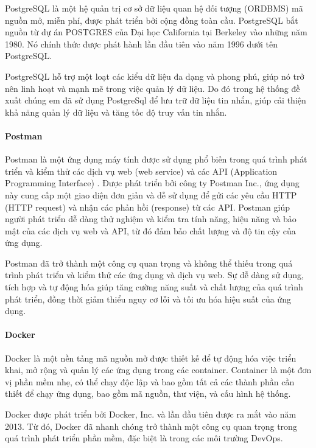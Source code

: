 PostgreSQL là một hệ quản trị cơ sở dữ liệu quan hệ đối tượng (ORDBMS) mã nguồn mở, miễn phí, được phát triển bởi cộng đồng toàn cầu. PostgreSQL bắt nguồn từ dự án POSTGRES của Đại học California tại Berkeley vào những năm 1980. Nó chính thức được phát hành lần đầu tiên vào năm 1996 dưới tên PostgreSQL.

PostgreSQL hỗ trợ một loạt các kiểu dữ liệu đa dạng và phong phú, giúp nó trở nên linh hoạt và mạnh mẽ trong việc quản lý dữ liệu. Do đó trong hệ thống đề xuất chúng em đã sử dụng PostgreSql để lưu trữ dữ liệu tin nhắn, giúp cải thiện khả năng quản lý dữ liệu và tăng tốc độ truy vấn tin nhắn.
\paragraph{Postman}
\mbox{}

Postman là một ứng dụng máy tính được sử dụng phổ biến trong quá trình phát triển và kiểm thử các dịch vụ web (web service) và các API (Application Programming Interface) \cite{postman_1}. Được phát triển bởi công ty Postman Inc., ứng dụng này cung cấp một giao diện đơn giản và dễ sử dụng để gửi các yêu cầu HTTP (HTTP request) và nhận các phản hồi (response) từ các API. Postman giúp người phát triển dễ dàng thử nghiệm và kiểm tra tính năng, hiệu năng và bảo mật của các dịch vụ web và API, từ đó đảm bảo chất lượng và độ tin cậy của ứng dụng.

Postman đã trở thành một công cụ quan trọng và không thể thiếu trong quá trình phát triển và kiểm thử các ứng dụng và dịch vụ web. Sự dễ dàng sử dụng, tích hợp và tự động hóa giúp tăng cường năng suất và chất lượng của quá trình phát triển, đồng thời giảm thiểu nguy cơ lỗi và tối ưu hóa hiệu suất của ứng dụng.

\paragraph{Docker}
\mbox{}

Docker là một nền tảng mã nguồn mở được thiết kế để tự động hóa việc triển khai, mở rộng và quản lý các ứng dụng trong các container. Container là một đơn vị phần mềm nhẹ, có thể chạy độc lập và bao gồm tất cả các thành phần cần thiết để chạy ứng dụng, bao gồm mã nguồn, thư viện, và cấu hình hệ thống.

Docker được phát triển bởi Docker, Inc. và lần đầu tiên được ra mắt vào năm 2013. Từ đó, Docker đã nhanh chóng trở thành một công cụ quan trọng trong quá trình phát triển phần mềm, đặc biệt là trong các môi trường DevOps.

